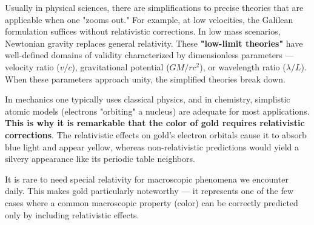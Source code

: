 \begin{commentary}
  Usually in physical sciences, there are simplifications to precise theories that are applicable when one "zooms out." For example, at low velocities, the Galilean formulation suffices without relativistic corrections. In low mass scenarios, Newtonian gravity replaces general relativity. These \textbf{"low-limit theories"} have well-defined domains of validity characterized by dimensionless parameters — velocity ratio ($v/c$), gravitational potential ($GM/rc^2$), or wavelength ratio ($\lambda/L$). When these parameters approach unity, the simplified theories break down.
  
  In mechanics one typically uses classical physics, and in chemistry, simplistic atomic models (electrons "orbiting" a nucleus) are adequate for most applications. \textbf{This is why it is remarkable that the color of gold requires relativistic corrections}. The relativistic effects on gold's electron orbitals cause it to absorb blue light and appear yellow, whereas non-relativistic predictions would yield a silvery appearance like its periodic table neighbors.
  
  It is rare to need special relativity for macroscopic phenomena we encounter daily. This makes gold particularly noteworthy — it represents one of the few cases where a common macroscopic property (color) can be correctly predicted only by including relativistic effects.
\end{commentary}